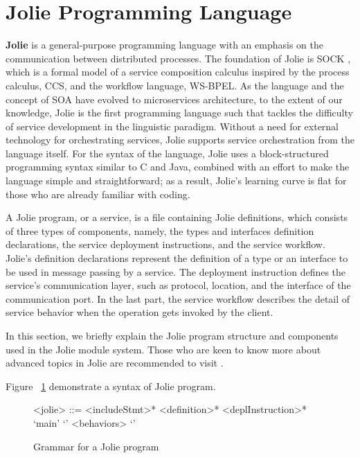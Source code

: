 \section{Jolie Programming Language}

\textbf{Jolie}\cite{JOLIE} is a general-purpose programming language with an emphasis on the communication between distributed processes. The foundation of Jolie is SOCK \cite{10.1007/11948148-27}, which is a formal model of a service composition calculus inspired by the process calculus, CCS\cite{10.5555/539036}, and the workflow language, WS-BPEL\cite{OASIS}.
As the language and the concept of SOA have evolved to microservices architecture, to the extent of our knowledge, Jolie is the first programming language such that tackles the difficulty of service development in the linguistic paradigm\cite{DBLP:journals/corr/GuidiLMM17}.
Without a need for external technology for orchestrating services, Jolie supports service orchestration from the language itself.
For the syntax of the language, Jolie uses a block-structured programming syntax similar to C and Java, combined with an effort to make the language simple and straightforward; as a result, Jolie's learning curve is flat for those who are already familiar with coding.

A Jolie program, or a service, is a file containing Jolie definitions, which consists of three types of components, namely, the types and interfaces definition declarations, the service deployment instructions, and the service workflow. Jolie's definition declarations represent the definition of a type or an interface to be used in message passing by a service. The deployment instruction defines the service's communication layer, such as protocol, location, and the interface of the communication port. In the last part, the service workflow describes the detail of service behavior when the operation gets invoked by the client.

In this section, we briefly explain the Jolie program structure and components used in the Jolie module system. Those who are keen to know more about advanced topics in Jolie are recommended to visit \cite{joliedoc, JOLIE}.

Figure ~\ref{fig:JolieGrammar} demonstrate a syntax of Jolie program.

\begin{figure}[h]
    \begin{framed}
        \begin{grammar}
            <jolie> ::= <includeStmt>* <definition>* <deplInstruction>*  `main' `{' <behaviors> `}'
        \end{grammar}
    \end{framed}
    \caption{Grammar for a Jolie program}
    \label{fig:JolieGrammar}
\end{figure}

